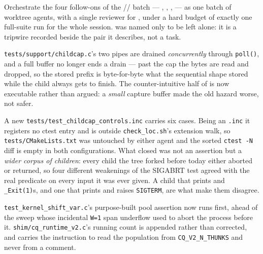 
Orchestrate the four follow-ons of the // batch ---
, , ,  --- as one batch of worktree agents, with a
single reviewer for , under a hard budget of exactly one full-suite run for the
whole session.  was named only to be left alone: it is a tripwire recorded beside
the pair it describes, not a task.

\texttt{tests/support/childcap.c}'s two pipes are drained \emph{concurrently} through
\texttt{poll()}, and a full buffer no longer ends a drain --- past the cap the bytes are read
and dropped, so the stored prefix is byte-for-byte what the sequential shape stored while the
child always gets to finish. The counter-intuitive half of  is now executable rather
than argued: a \emph{small} capture buffer made the old hazard worse, not safer.

A new \texttt{tests/test\_childcap\_controls.inc} carries six cases. Being an \texttt{.inc} it
registers no ctest entry and is outside \texttt{check\_loc.sh}'s extension walk, so
\texttt{tests/CMakeLists.txt} was untouched by either agent and the sorted \texttt{ctest -N}
diff is empty in both configurations. What closed  was not an assertion but a
\emph{wider corpus of children}: every child the tree forked before today either aborted or
returned, so four different weakenings of the SIGABRT test agreed with the real predicate on
every input it was ever given. A child that prints and \texttt{\_Exit(1)}s, and one that prints
and raises \texttt{SIGTERM}, are what make them disagree.

\texttt{test\_kernel\_shift\_var.c}'s purpose-built pool assertion now runs first, ahead of the
sweep whose incidental \texttt{W=1} span underflow used to abort the process before it.
\texttt{shim/cq\_runtime\_v2.c}'s running count is appended rather than corrected, and carries
the instruction to read the population from \texttt{CQ\_V2\_N\_THUNKS} and never from a comment.

